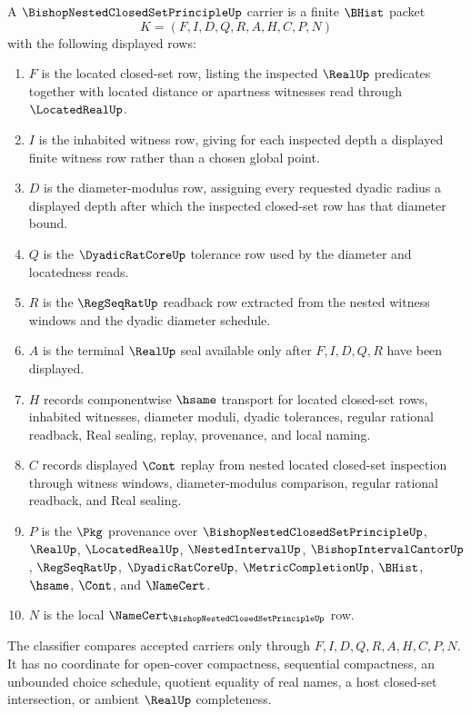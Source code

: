 \begin{definition}
\label{def:bishop-nested-closed-set-carrier}
A $\BishopNestedClosedSetPrincipleUp$ carrier is a finite $\BHist$ packet
$$
K=(F,I,D,Q,R,A,H,C,P,N)
$$
with the following displayed rows:
\begin{enumerate}
\item $F$ is the located closed-set row, listing the inspected $\RealUp$ predicates together with located distance or apartness witnesses read through $\LocatedRealUp$.
\item $I$ is the inhabited witness row, giving for each inspected depth a displayed finite witness row rather than a chosen global point.
\item $D$ is the diameter-modulus row, assigning every requested dyadic radius a displayed depth after which the inspected closed-set row has that diameter bound.
\item $Q$ is the $\DyadicRatCoreUp$ tolerance row used by the diameter and locatedness reads.
\item $R$ is the $\RegSeqRatUp$ readback row extracted from the nested witness windows and the dyadic diameter schedule.
\item $A$ is the terminal $\RealUp$ seal available only after $F,I,D,Q,R$ have been displayed.
\item $H$ records componentwise $\hsame$ transport for located closed-set rows, inhabited witnesses, diameter moduli, dyadic tolerances, regular rational readback, Real sealing, replay, provenance, and local naming.
\item $C$ records displayed $\Cont$ replay from nested located closed-set inspection through witness windows, diameter-modulus comparison, regular rational readback, and Real sealing.
\item $P$ is the $\Pkg$ provenance over $\BishopNestedClosedSetPrincipleUp$, $\RealUp$, $\LocatedRealUp$, $\NestedIntervalUp$, $\BishopIntervalCantorUp$, $\RegSeqRatUp$, $\DyadicRatCoreUp$, $\MetricCompletionUp$, $\BHist$, $\hsame$, $\Cont$, and $\NameCert$.
\item $N$ is the local $\NameCert_{\BishopNestedClosedSetPrincipleUp}$ row.
\end{enumerate}
The classifier compares accepted carriers only through $F,I,D,Q,R,A,H,C,P,N$. It has no coordinate for open-cover compactness, sequential compactness, an unbounded choice schedule, quotient equality of real names, a host closed-set intersection, or ambient $\RealUp$ completeness.
\end{definition}

